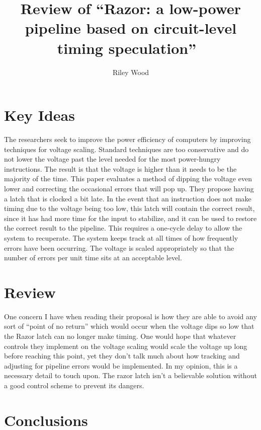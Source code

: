 \documentclass{article}
\title{Review of ``Razor: a low-power pipeline based on circuit-level timing speculation''~\cite{razor}}
\author{Riley Wood}
\begin{document}
\maketitle

\section*{Key Ideas}
The researchers seek to improve the power efficiency of computers by
improving techniques for voltage scaling. Standard techniques are too
conservative and do not lower the voltage past the level needed for the most
power-hungry instructions. The result is that the voltage is higher than it
needs to be the majority of the time. This paper evaluates a method of
dipping the voltage even lower and correcting the occasional errors that
will pop up. They propose having a latch that is clocked a bit late. In the event that
an instruction does not make timing due to the voltage being too low, this latch
will contain the correct result, since it has had more time for the input to
stabilize, and it can be used to restore the correct result to the pipeline.
This requires a one-cycle delay to allow the system to recuperate. The system
keeps track at all times of how frequently errors have been occurring. The
voltage is scaled appropriately so that the number of errors per unit time sits
at an acceptable level.


\section*{Review}
One concern I have when reading their proposal is how they are able to avoid
any sort of ``point of no return'' which would occur when the voltage dips so
low that the Razor latch can no longer make timing. One would hope that
whatever controls they implement on the voltage scaling would scale the
voltage up long before reaching this point, yet they don't talk much about how
tracking and adjusting for pipeline errors would be implemented. In my opinion,
this is a necessary detail to touch upon. The razor latch isn't a believable solution
without a good control scheme to prevent its dangers.


\section*{Conclusions}




\end{document}
